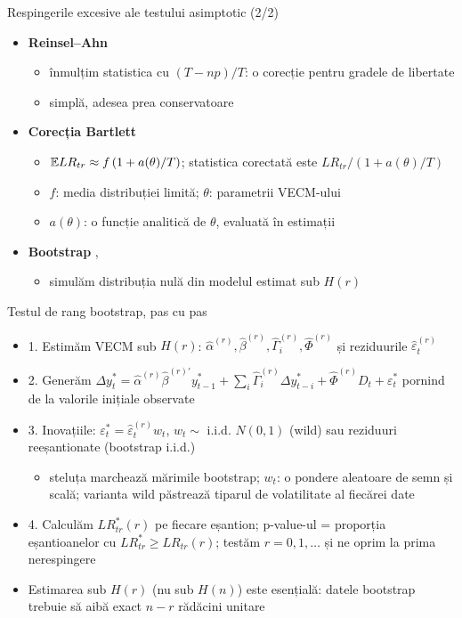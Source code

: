 \begin{frame}{Respingerile excesive ale testului asimptotic (2/2)}
\itemsize{\small}
\begin{itemize}
    \item \textbf{Reinsel--Ahn} 
    \begin{itemize}
        \item înmulțim statistica cu $(T - np)/T$: o corecție pentru gradele de libertate
        \item simplă, adesea prea conservatoare
    \end{itemize}
    \item \textbf{Corecția Bartlett} 
    \begin{itemize}
        \item $\mathbb{E} LR_{tr} \approx f\,(1 + a(\theta)/T)$; statistica corectată este $LR_{tr}/(1 + a(\theta)/T)$
        \item $f$: media distribuției limită; $\theta$: parametrii VECM-ului
        \item $a(\theta)$: o funcție analitică de $\theta$, evaluată în estimații
    \end{itemize}
    \item \textbf{Bootstrap} , 
    \begin{itemize}
        \item simulăm distribuția nulă din modelul estimat sub $H(r)$
    \end{itemize}
\end{itemize}
\end{frame}

\begin{frame}{Testul de rang bootstrap, pas cu pas}
\itemsize{\small}
\begin{itemize}
    \item 1. Estimăm VECM sub $H(r)$: $\hat\alpha^{(r)}, \hat\beta^{(r)}, \hat\Gamma_i^{(r)}, \hat\Phi^{(r)}$ și reziduurile $\hat\varepsilon_t^{(r)}$
    \item 2. Generăm $\Delta y_t^* = \hat\alpha^{(r)}\hat\beta^{(r)\prime}y_{t-1}^* + \sum_i\hat\Gamma_i^{(r)}\Delta y_{t-i}^* + \hat\Phi^{(r)}D_t + \varepsilon_t^*$ pornind de la valorile inițiale observate
    \item 3. Inovațiile: $\varepsilon_t^* = \hat\varepsilon_t^{(r)}w_t$, $w_t \sim$ i.i.d. $N(0, 1)$ (wild) sau reziduuri reeșantionate (bootstrap i.i.d.)
    \begin{itemize}
        \item steluța marchează mărimile bootstrap; $w_t$: o pondere aleatoare de semn și scală; varianta wild păstrează tiparul de volatilitate al fiecărei date
    \end{itemize}
    \item 4. Calculăm $LR_{tr}^*(r)$ pe fiecare eșantion; p-value-ul = proporția eșantioanelor cu $LR_{tr}^* \ge LR_{tr}(r)$; testăm $r = 0, 1, \dots$ și ne oprim la prima nerespingere
    \item Estimarea sub $H(r)$ (nu sub $H(n)$) este esențială: datele bootstrap trebuie să aibă exact $n - r$ rădăcini unitare 
\end{itemize}
\end{frame}

